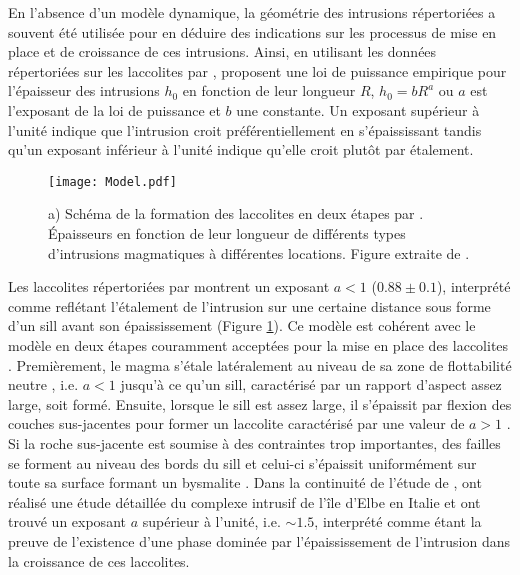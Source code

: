 En  l'absence  d'un  modèle  dynamique, la  géométrie  des  intrusions
répertoriées a  souvent été utilisée  pour en déduire  des indications
sur les processus de mise en place et de croissance de ces intrusions.
Ainsi, en  utilisant les données  répertoriées sur les  laccolites par
\citet{E:2015tl},  \citet{McCaffrey:1997ea}   proposent  une   loi  de
puissance empirique pour l'épaisseur  des intrusions $h_0$ en fonction
de leur longueur $R$, $h_0 = bR^a$  ou $a$ est l'exposant de la loi de
puissance  et $b$  une  constante.  Un  exposant  supérieur à  l'unité
indique  que l'intrusion  croit  préférentiellement en  s'épaississant
tandis qu'un exposant inférieur à l'unité indique qu'elle croit plutôt
par étalement.

\begin{figure}[htpb]
  \begin{center}
    \graphicspath{ {/Users/thorey/Documents/These/Manuscript/Figure/Chapter1/} }
    \texttt{[image: Model.pdf]}
    \caption{a) Schéma de  la formation des laccolites  en deux étapes
      par  \citet{McCaffrey:1997ea}.  Épaisseurs  en fonction  de leur
      longueur   de  différents   types  d'intrusions   magmatiques  à
      différentes locations.  Figure extraite de \citet{Cruden:tg}.}
    \label{C1-Model}
  \end{center}
\end{figure}

Les laccolites répertoriées par  \citet{E:2015tl} montrent un exposant
$a<1$  ($0.88 \pm  0.1$),  interprété comme  reflétant l'étalement  de
l'intrusion sur une  certaine distance sous forme d'un  sill avant son
épaississement (Figure \ref{C1-Model}). Ce modèle est cohérent avec le
modèle en deux  étapes couramment acceptées pour la mise  en place des
laccolites \citep{Johnson:1973ho,McCaffrey:1997ea}.   Premièrement, le
magma s'étale latéralement au niveau de sa zone de flottabilité neutre
,  i.e.  $a<1$  jusqu'à  ce  qu'un sill,  caractérisé  par un  rapport
d'aspect assez large, soit formé.   Ensuite, lorsque le sill est assez
large, il s'épaissit par flexion  des couches sus-jacentes pour former
un    laccolite    caractérisé    par     une    valeur    de    $a>1$
\citep{Johnson:1973ho,Koch:1981if}.   Si  la   roche  sus-jacente  est
soumise à des contraintes trop  importantes, des failles se forment au
niveau des bords du sill et celui-ci s'épaissit uniformément sur toute
sa surface formant un  bysmalite \citep{E:2015tl}.  Dans la continuité
de  l'étude  de  \citet{McCaffrey:1997ea},  \citet{Rocchi:2002jy}  ont
réalisé une  étude détaillée du  complexe intrusif de l'île  d'Elbe en
Italie  et  ont trouvé  un  exposant  $a$  supérieur à  l'unité,  i.e.
$\sim  1.5$, interprété  comme étant  la preuve  de l'existence  d'une
phase dominée  par l'épaississement de l'intrusion  dans la croissance
de ces laccolites.

